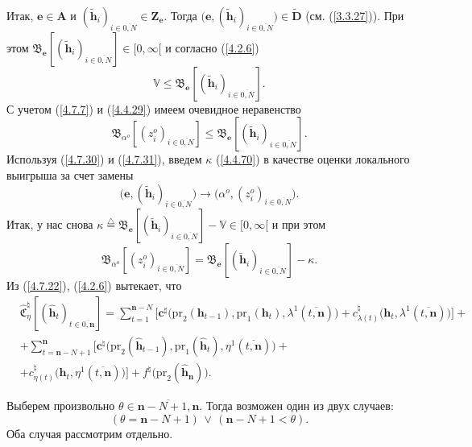 \documentclass[11pt,twoside,openany]{report}
\newcommand{\bfn}{\begin{equation}}
\newcommand{\efn}{\end{equation}}
\newcommand{\df}{\stackrel{\triangle}{=}}
\newcommand{\ov}{\overline}
\newcommand{\la}{\lambda}
\newcommand{\al}{\alpha}
\newcommand{\bbv}{{\mathbb V}}
\newcommand{\zc}{{\mathbf c}}
\newcommand{\nn}{{\mathbf n}}
\begin{document}
{{Итак, $\mathbf{e}\in \mathbf{A}$ и $(\tilde{\mathbf{h}}_i)_{i\in\ov{0,N}}\in
\mathbf{Z}_\mathbf{e}.$ Тогда $\bigl(\mathbf{e},(\tilde{\mathbf{h}}_i)_{i\in\ov{0,N}}\bigl)\in
\widetilde{\mathbf{D}}$ (см.  (\ref{3.3.27})). При этом
$\mathfrak{B}_\mathbf{e}[(\tilde{\mathbf{h}}_i)_{i\in\ov{0,N}}]\in [0,\infty[$ и согласно (\ref{4.2.6})
\bfn\label{4.7.30}\bbv\leqslant \mathfrak{B}_\mathbf{e}[(\tilde{\mathbf{h}}_i)_{i\in\ov{0,N}}].
\efn
С учетом (\ref{4.7.7}) и (\ref{4.4.29}) имеем очевидное неравенство
\bfn\label{4.7.31}\mathfrak{B}_{\al^o}[(z_i^o)_{i\in\ov{0,N}}] \leqslant
\mathfrak{B}_\mathbf{e}[(\tilde{\mathbf{h}}_i)_{i\in\ov{0,N}}].
\efn
Используя (\ref{4.7.30}) и (\ref{4.7.31}), введем $\kappa$ (\ref{4.4.70}) в
качестве оценки локального выигрыша за счет замены
$$\bigl(\mathbf{e},(\tilde{\mathbf{h}}_i)_{i\in\ov{0,N}}\bigl) \longrightarrow \bigl(\al^o,
(z_i^o)_{i\in\ov{0,N}}\bigl).
$$
Итак, у нас снова $\kappa \df \mathfrak{B}_\mathbf{e}[(\tilde{\mathbf{h}}_i)_{i\in\ov{0,N}}]-
\bbv \in [0,\infty[$  и при этом
\bfn\label{4.7.32}\mathfrak{B}_{\al^o}[(z_i^o)_{i\in\ov{0,N}}] =
\mathfrak{B}_\mathbf{e}[(\tilde{\mathbf{h}}_i)_{i\in\ov{0,N}}]- \kappa.
\efn
Из (\ref{4.7.22}), (\ref{4.2.6})
вытекает, что
\begin{eqnarray}
&\widehat{\mathfrak{C}}_\eta^\natural[(\hat{\mathbf{h}}_t)_{t\in\ov{0,\nn}}]=
\sum\limits_{t=1}^{\nn-N}\bigl[\zc^\sharp\bigl(\mathrm{pr}_2(\mathbf{h}_{t-1}),\mathrm{pr}_1
(\mathbf{h}_t),\la^1(\ov{t,\nn})\bigl) +c_{\la(t)}^\natural\bigl(\mathbf{h}_t,\la^1(\ov{t,\nn})\bigl)\bigl]+
&\nonumber\\
&+\sum\limits_{t=\nn-N+1}^\nn\bigl[\zc^\natural\bigl(\mathrm{pr}_2(\hat{\mathbf{h}}_{t-1}),
\mathrm{pr}_1(\hat{\mathbf{h}}_t),\eta^1(\ov{t,\nn})\bigl) +
&\nonumber\\
&+c_{\eta(t)}^\natural\bigl(\hat{\mathbf{h}}_t,\eta^1(\ov{t,\nn})\bigl)\bigl] +
f^\natural\bigl(\mathrm{pr}_2(\hat{\mathbf{h}}_\nn)\bigl).
&\label{4.7.33}
\end{eqnarray}

Выберем произвольно $\theta\in\ov{\nn-N+1,\nn}.$ Тогда возможен один из двух случаев:
\bfn\label{4.7.38}(\theta =\nn-N+1)\,\vee\,(\nn-N+1< \theta).
\efn
Оба случая рассмотрим отдельно.

}}
\end{document}

